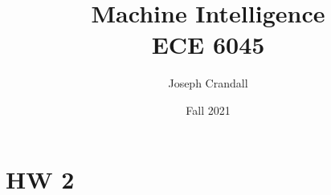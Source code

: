 
\usepackage{algorithm, algpseudocode, color, gensymb, siunitx, soul, subfiles}

\title{Machine Intelligence\\
\large ECE 6045}
\author{Joseph Crandall}
\date{Fall 2021}


\maketitle

%

\section{HW 2}


%

%

%

%

%

%


